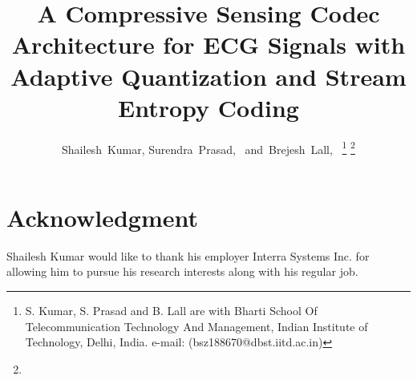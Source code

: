 \documentclass[journal, a4paper]{IEEEtran} %
\begin{document}
\title{A Compressive Sensing Codec Architecture for ECG Signals
with Adaptive Quantization and Stream Entropy Coding}


\author{Shailesh~Kumar,
        Surendra~Prasad,~
        and~Brejesh~Lall,~%
\thanks{S. Kumar, S. Prasad and B. Lall are with 
Bharti School Of Telecommunication Technology And Management, Indian Institute of Technology, Delhi,
India. e-mail: (bsz188670@dbst.iitd.ac.in)}%
\thanks{
}}

\maketitle


\IEEEpeerreviewmaketitle









\begin{appendices}

\end{appendices}

\section*{Acknowledgment}
Shailesh Kumar would like to thank his employer Interra Systems Inc.
for allowing him to pursue his research interests along with his regular job.




\ifCLASSOPTIONcaptionsoff
  \newpage
\fi





\end{document}
